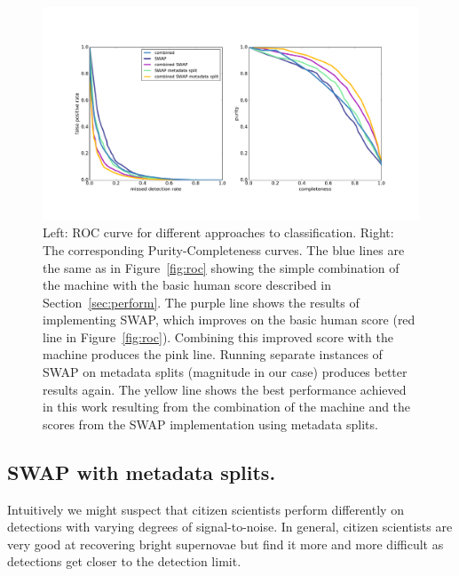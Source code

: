 \documentclass[a4paper,fleqn,usenatbib]{mnras}
\begin{document}
\begin{figure}
   \begin{minipage}{160mm}
     \includegraphics[trim=35mm 35mm 35mm 35mm,clip,width=160mm]{figs/roc_1.pdf}
   \caption{Left: ROC curve for different approaches to classification.  Right: The corresponding Purity-Completeness curves.  The blue lines are the same as in Figure~\ref{fig:roc} showing the simple combination of the machine with the basic human score described in Section~\ref{sec:perform}.  The purple line shows the results of implementing SWAP, which improves on the basic human score (red line in Figure~\ref{fig:roc}).  Combining this improved score with the machine produces the pink line.  Running separate instances of SWAP on metadata splits (magnitude in our case) produces better results again.  The yellow line shows the best performance achieved in this work resulting from the combination of the machine and the scores from the SWAP implementation using metadata splits.}
   \label{fig:roc_1} 
   \end{minipage}
\end{figure}

\subsection{SWAP with metadata splits.}
Intuitively we might suspect that citizen scientists perform differently on detections with varying degrees of signal-to-noise.   In general, citizen scientists are very good at recovering bright supernovae but find it more and more difficult as detections get closer to the detection limit.
\end{document}
